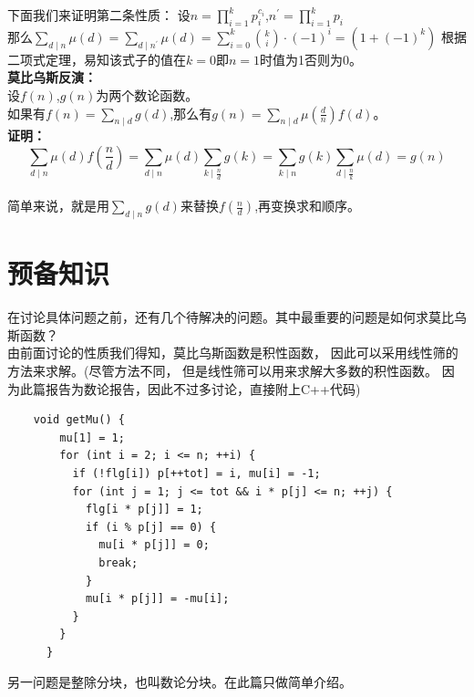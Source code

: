 \documentclass{hfutreport}
\begin{document}
下面我们来证明第二条性质：
设$ n = \prod_{i=1}^{k}p_i^{c_i} $,$n^{\prime} = \prod_{i=1}^{k}p_i$ \\

那么$\sum_{d \mid n}\mu(d) = \sum_{d \mid n^{\prime}}\mu(d) = \sum_{i=0}^{k}\binom{k}{i} \cdot (-1)^{i} = \left(1 + (-1)^{k}\right)$
根据二项式定理，易知该式子的值在$k = 0$即$n = 1$时值为1否则为0。\\

\textbf{莫比乌斯反演：} \\

设$f(n)$,$g(n)$为两个数论函数。\\

如果有$f(n) = \sum_{n \mid d}g(d)$,那么有$g(n) = \sum_{n \mid d}\mu(\frac{d}{n})f(d)$。\\

\textbf{证明：} \\
\[
    \sum_{d \mid n}\mu(d)f(\frac{n}{d}) = \sum_{d \mid n}\mu(d)\sum_{k \mid \frac{n}{d}}g(k) = \sum_{k \mid n}g(k)\sum_{d \mid \frac{n}{k}}\mu(d) = g(n)
\]\\

简单来说，就是用$\sum_{d \mid n}g(d)$来替换$f(\frac{n}{d})$,再变换求和顺序。\\

\section{预备知识}

在讨论具体问题之前，还有几个待解决的问题。其中最重要的问题是如何求莫比乌斯函数？\\

由前面讨论的性质我们得知，莫比乌斯函数是积性函数，
因此可以采用线性筛的方法来求解。(尽管方法不同，
但是线性筛可以用来求解大多数的积性函数。
因为此篇报告为数论报告，因此不过多讨论，直接附上C++代码)\\

\begin{lstlisting}
    void getMu() {
        mu[1] = 1;
        for (int i = 2; i <= n; ++i) {
          if (!flg[i]) p[++tot] = i, mu[i] = -1;
          for (int j = 1; j <= tot && i * p[j] <= n; ++j) {
            flg[i * p[j]] = 1;
            if (i % p[j] == 0) {
              mu[i * p[j]] = 0;
              break;
            }
            mu[i * p[j]] = -mu[i];
          }
        }
      }
\end{lstlisting}
    
另一问题是整除分块，也叫数论分块。在此篇只做简单介绍。\\
\end{document}
